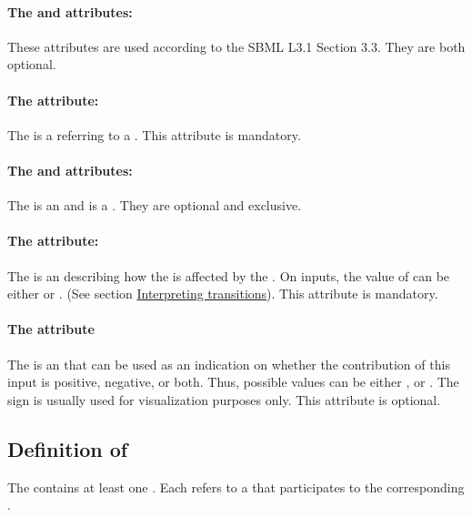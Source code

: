 \paragraph{The  and  attributes:}
 These attributes are used according to the SBML L3.1 Section 3.3. They are both optional.

\paragraph{The  attribute:}
The  is a  referring to a . This attribute is mandatory.

\paragraph{The  and  attributes:}
The  is an  and  is a . They are optional and exclusive.

\paragraph{The  attribute:}
The  is an  describing how the  is affected by the . On inputs, the value of  can be either  or . (See section \hyperlink{inter_trans}{Interpreting transitions}). This attribute is mandatory.

\paragraph{The  attribute}
The  is an  that can be used as an indication on whether the contribution of this input is positive, negative, or both. Thus, possible values can be either ,  or . The sign is usually used for visualization purposes only. This attribute is optional.

\bigskip
\subsection*{Definition of } %
The  contains at least one .
Each  refers to a  that participates to the corresponding .

